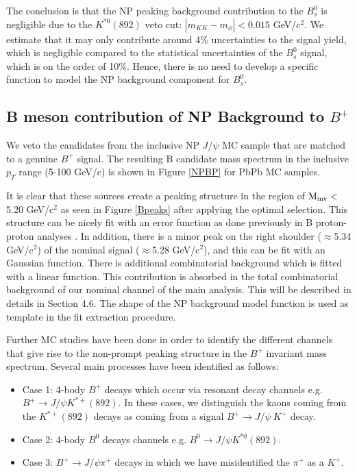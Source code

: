  

The conclusion is that the NP peaking background contribution to the $B^0_s$ is negligible due to the $K^{*0} (892)$ veto cut: $|m_{KK} - m_\phi| < 0.015$ GeV/c$^2$. We estimate that it may only contribute around 4\% uncertainties to the signal yield, which is negligible compared to the statistical uncertainties of the $B^0_s$ signal, which is on the order of 10\%. Hence, there is no need to develop a specific function to model the NP background component for $B^0_s$.


\subsection{B meson contribution of NP Background to $B^+$}

We veto the candidates from the inclusive NP $J/\psi$ MC sample that are matched to a genuine $B^+$ signal. The resulting B candidate mass spectrum in the inclusive $p_T$ range (5-100 GeV/c) is shown in Figure \ref{NPBP} for PbPb MC samples. 

It is clear that these sources create a peaking structure in the region of $\rm M_{inv}<$5.20 GeV/c$^2$ as seen in Figure \ref{Bpeaks} after applying the optimal selection. This structure can be nicely fit with an error function as done previously in B proton-proton analyses \cite{CMSBPH}. In addition, there is a minor peak on the right shoulder ($\approx$5.34 GeV/c$^2$) of the nominal signal ($\approx$5.28 GeV/c$^2$), and this can be fit with an Gaussian function. There is additional combinatorial background which is fitted with a linear function. This contribution is absorbed in the total combinatorial background of our nominal channel of the main analysis. This will be described in details in Section 4.6. The shape of the NP background model function is used as template in the fit extraction procedure. 

Further MC studies have been done in order to identify the different channels that give rise to the non-prompt peaking structure in the $B^+$ invariant mass spectrum. Several main processes have been identified as follows:

\begin{itemize}
\item Case 1: 4-body $B^+$ decays which occur via resonant decay channels e.g. $B^+\rightarrow J/\psi K^{*+}(892)$. In these cases, we distinguish the kaons coming from the $K^{*+}(892)$ decays as coming from a signal $B^+\rightarrow J/\psi~K^+$ decay. 
\item Case 2: 4-body $B^0$ decays channels e.g. $B^0\rightarrow J/\psi K^{*0}(892)$.
\item Case 3: $B^+\rightarrow J/\psi\pi^+$ decays in which we have misidentified the $\pi^+$ as a $K^+$.
\end{itemize}

